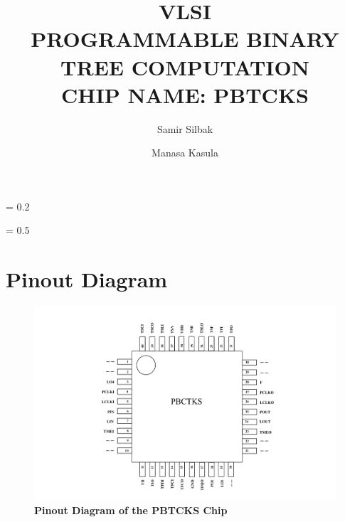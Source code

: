\documentclass[a4paper]{article}
\title{
    \vspace{2in}
    \textbf{VLSI \\}
    \vspace{10pt}
    \textbf{PROGRAMMABLE BINARY TREE COMPUTATION\\}
    \vspace{10pt}
    \textbf{CHIP NAME: PBTCKS}
    \vspace{2in}
}
\author[1]{Samir Silbak}
\author[2]{Manasa Kasula}
\affil[1]{silbaksr@mail.uc.edu}
\affil[2]{kasulama@mail.uc.edu
    \vspace{10pt}
}
\affil[1]{(513) 207-0687}
\affil[2]{(847) 612-7364
    \vspace{2.0in}
}
\begin{document}
%
\maketitle
\newpage
\parskip = 0.2\baselineskip
\newpage
\tableofcontents
\newpage
\listoffigures
\listoftables
\lstlistoflistings
\parskip = 0.5\baselineskip
\newpage

\section{\textbf{Pinout Diagram}}
    \begin{figure}[H]
        \centering
        \includegraphics[width=\textwidth,height=\textheight,keepaspectratio]{../pinouts/pinout_diagram.png}
        \caption{\textbf{Pinout Diagram of the PBTCKS Chip}}
        \label{fig:gg}
    \end{figure}
\end{document}
